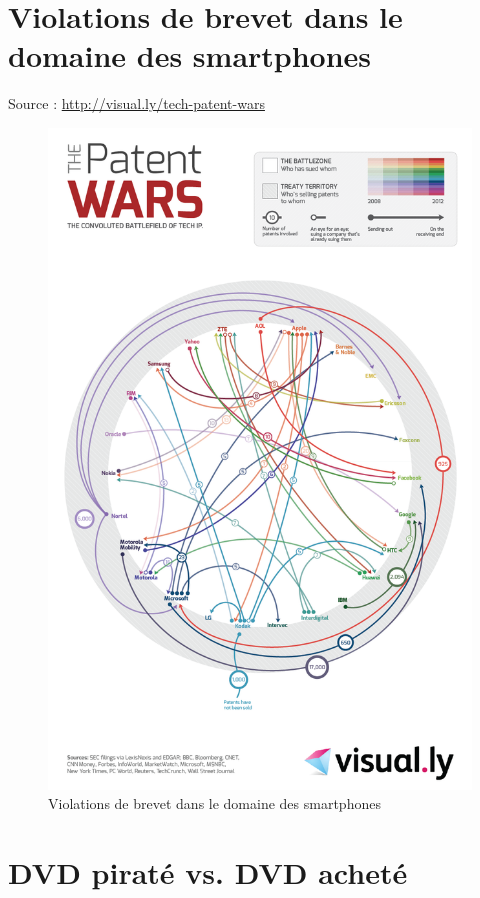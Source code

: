 \chapter{Violations de brevet dans le domaine des smartphones}
\label{annexe-smartphones}

Source : \url{http://visual.ly/tech-patent-wars}

\newpage

\begin{figure}[H]
\center
\includegraphics[scale=.442]{images/patent-wars.png}
\caption{Violations de brevet dans le domaine des smartphones}
\end{figure}

\chapter{DVD piraté vs. DVD acheté}
\label{annexe-dvd}

